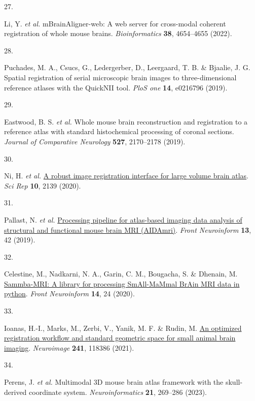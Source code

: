 \documentclass[
  12pt,
]{article}
\newlength{\cslhangindent}
\newlength{\csllabelwidth}
\newenvironment{CSLReferences}[2] %
 {\begin{list}{}{%
  \setlength{\itemindent}{0pt}
  \setlength{\leftmargin}{0pt}
  \setlength{\parsep}{0pt}
  \ifodd #1
   \setlength{\leftmargin}{\cslhangindent}
   \setlength{\itemindent}{-1\cslhangindent}
  \fi
  \setlength{\itemsep}{#2\baselineskip}}}
 {\end{list}}
\newcommand{\CSLLeftMargin}[1]{\parbox[t]{\csllabelwidth}{\strut#1\strut}}
\newcommand{\CSLRightInline}[1]{\parbox[t]{\linewidth - \csllabelwidth}{\strut#1\strut}}
\begin{document}
\begin{CSLReferences}{0}{0}
\CSLLeftMargin{27. }%
\CSLRightInline{Li, Y. \emph{et al.} mBrainAligner-web: A web server for
cross-modal coherent registration of whole mouse brains.
\emph{Bioinformatics} \textbf{38}, 4654--4655 (2022).}

\CSLLeftMargin{28. }%
\CSLRightInline{Puchades, M. A., Csucs, G., Ledergerber, D., Leergaard,
T. B. \& Bjaalie, J. G. Spatial registration of serial microscopic brain
images to three-dimensional reference atlases with the QuickNII tool.
\emph{PloS one} \textbf{14}, e0216796 (2019).}

\CSLLeftMargin{29. }%
\CSLRightInline{Eastwood, B. S. \emph{et al.} Whole mouse brain
reconstruction and registration to a reference atlas with standard
histochemical processing of coronal sections. \emph{Journal of
Comparative Neurology} \textbf{527}, 2170--2178 (2019).}

\CSLLeftMargin{30. }%
\CSLRightInline{Ni, H. \emph{et al.}
\href{https://doi.org/10.1038/s41598-020-59042-y}{A robust image
registration interface for large volume brain atlas}. \emph{Sci Rep}
\textbf{10}, 2139 (2020).}

\CSLLeftMargin{31. }%
\CSLRightInline{Pallast, N. \emph{et al.}
\href{https://doi.org/10.3389/fninf.2019.00042}{Processing pipeline for
atlas-based imaging data analysis of structural and functional mouse
brain MRI (AIDAmri)}. \emph{Front Neuroinform} \textbf{13}, 42 (2019).}

\CSLLeftMargin{32. }%
\CSLRightInline{Celestine, M., Nadkarni, N. A., Garin, C. M., Bougacha,
S. \& Dhenain, M.
\href{https://doi.org/10.3389/fninf.2020.00024}{Sammba-MRI: A library
for processing SmAll-MaMmal BrAin MRI data in python}. \emph{Front
Neuroinform} \textbf{14}, 24 (2020).}

\CSLLeftMargin{33. }%
\CSLRightInline{Ioanas, H.-I., Marks, M., Zerbi, V., Yanik, M. F. \&
Rudin, M. \href{https://doi.org/10.1016/j.neuroimage.2021.118386}{An
optimized registration workflow and standard geometric space for small
animal brain imaging}. \emph{Neuroimage} \textbf{241}, 118386 (2021).}

\CSLLeftMargin{34. }%
\CSLRightInline{Perens, J. \emph{et al.} Multimodal 3D mouse brain atlas
framework with the skull-derived coordinate system.
\emph{Neuroinformatics} \textbf{21}, 269--286 (2023).}


\end{CSLReferences}
\end{document}
